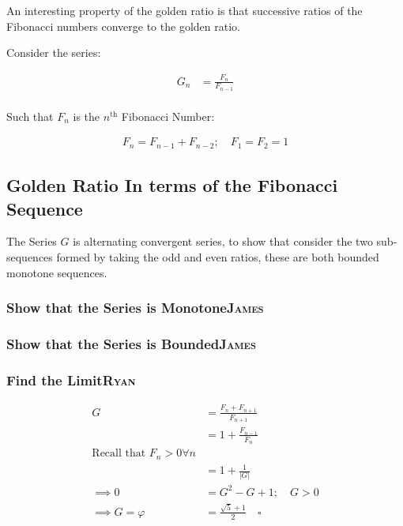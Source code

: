 \documentclass[a4paper,11pt,twoside]{article}
\begin{document}
An interesting property of the golden ratio is that successive ratios of the
Fibonacci numbers converge to the golden ratio.

Consider the series:

$$\begin{aligned}
G_n &= \frac{F_{n} }{F_{n - 1} } \\
\end{aligned}$$

Such that \(F_{n}\) is the \(n^{\mathrm{th}}\) Fibonacci Number:

$$\begin{aligned}
F_n = F_{n- 1} +  F_{n- 2} ; \quad F_1 = F_2 = 1
\end{aligned}$$

\subsection{Golden Ratio In terms of the Fibonacci Sequence}
\label{sec:orgfdeb12f}
The Series \(G\) is alternating convergent series, to show that consider the two sub-sequences formed by taking the odd and even ratios, these are both bounded monotone sequences.
\subsubsection{Show that the Series is Monotone\hfill{}\textsc{James}}
\label{sec:orgb7f53ba}
\subsubsection{Show that the Series is Bounded\hfill{}\textsc{James}}
\label{sec:org0d4c1a7}
\subsubsection{Find the Limit\hfill{}\textsc{Ryan}}
\label{sec:org0031026}
$$\begin{aligned}
G &= \frac{F_{n} +  F_{n+  1} }{F_{n+  1} } \\
&= 1 +  \frac{F_{n- 1} }{F_n} \\
\text{Recall that $F_n > 0 \forall n$}\\
&=  1 +  \frac{1}{    \left\lvert G \right\rvert } \\
 \implies  0 &= G^2- G +  1; \quad G > 0  \\
  \implies  G = \varphi &=  \frac{\sqrt{5} + 1  }{2} \quad  \square
\end{aligned}$$
\end{document}
